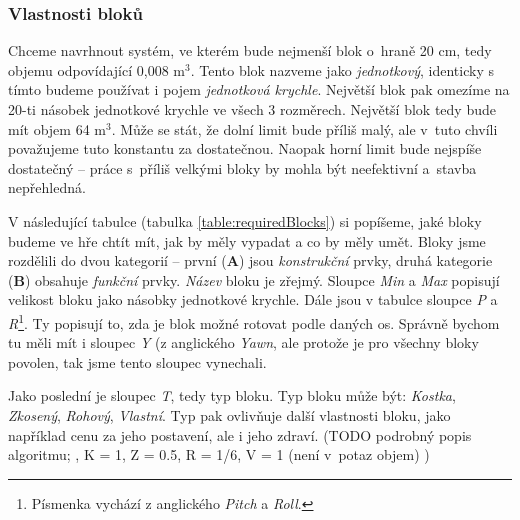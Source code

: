\subsubsection{Vlastnosti bloků}

Chceme navrhnout systém, ve kterém bude nejmenší blok o~hraně 20 cm, tedy objemu odpovídající 0,008 m$^3$. Tento blok nazveme jako \textit{jednotkový}, identicky s tímto budeme používat i pojem \textit{jednotková krychle}. Největší blok pak omezíme na 20-ti násobek jednotkové krychle ve všech 3 rozměrech. Největší blok tedy bude mít objem 64 m$^3$. Může se stát, že dolní limit bude příliš malý, ale v~tuto chvíli považujeme tuto konstantu za dostatečnou. Naopak horní limit bude nejspíše dostatečný -- práce s~příliš velkými bloky by mohla být neefektivní a~stavba nepřehledná.

V následující tabulce (tabulka \ref{table:requiredBlocks}) si popíšeme, jaké bloky budeme ve hře chtít mít, jak by měly vypadat a co by měly umět. Bloky jsme rozdělili do dvou kategorií -- první (\textbf{A}) jsou \textit{konstrukční} prvky, druhá kategorie (\textbf{B}) obsahuje \textit{funkční} prvky. \textit{Název} bloku je zřejmý. Sloupce \textit{Min} a \textit{Max} popisují velikost bloku jako násobky jednotkové krychle. Dále jsou v tabulce sloupce \textit{P} a \textit{R}\footnote{Písmenka vychází z anglického \textit{Pitch} a \textit{Roll}. }. Ty popisují to, zda je blok možné rotovat podle daných os. Správně bychom tu měli mít i sloupec \textit{Y} (z anglického \textit{Yawn}, ale protože je pro všechny bloky povolen, tak jsme tento sloupec vynechali. 


Jako poslední je sloupec \textit{T}, tedy typ bloku. Typ bloku může být: \textit{Kostka}, \textit{Zkosený}, \textit{Rohový}, \textit{Vlastní}. Typ pak ovlivňuje další vlastnosti bloku, jako například cenu za jeho postavení, ale i jeho zdraví. (TODO podrobný popis algoritmu; , K = 1, Z = 0.5, R = 1/6, V = 1 (není v~potaz objem) )


